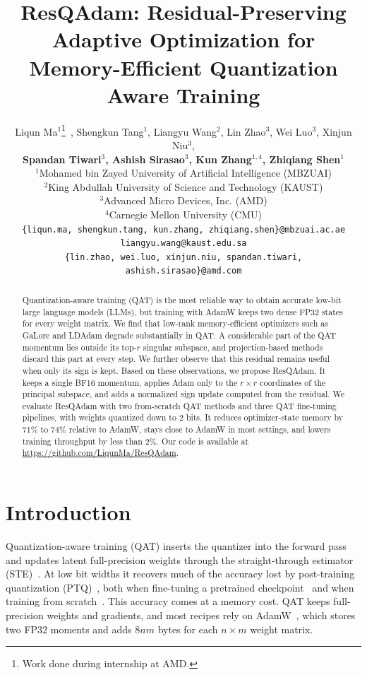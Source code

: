\documentclass{article} %
\title{ResQAdam: Residual-Preserving Adaptive Optimization for Memory-Efficient Quantization Aware Training}
\author{Liqun Ma$^{1}$\thanks{Work done during internship at AMD.}\ , Shengkun Tang$^{1}$, Liangyu Wang$^{2}$, Lin Zhao$^{3}$, Wei Luo$^{3}$, Xinjun Niu$^{3}$, \\
\textbf{Spandan Tiwari$^{3}$, Ashish Sirasao$^{3}$, Kun Zhang$^{1,4}$, Zhiqiang Shen$^{1}$} \\
$^{1}$Mohamed bin Zayed University of Artificial Intelligence (MBZUAI) \\
$^{2}$King Abdullah University of Science and Technology (KAUST) \\
$^{3}$Advanced Micro Devices, Inc. (AMD) \\
$^{4}$Carnegie Mellon University (CMU) \\
\small\texttt{\{liqun.ma, shengkun.tang, kun.zhang, zhiqiang.shen\}@mbzuai.ac.ae} \\
\small\texttt{liangyu.wang@kaust.edu.sa} \\
\small\texttt{\{lin.zhao, wei.luo, xinjun.niu, spandan.tiwari, ashish.sirasao\}@amd.com}
}
\begin{document}
\maketitle
\fancyhead{}
\renewcommand{\headrulewidth}{0pt}

\begin{abstract}


Quantization-aware training (QAT) is the most reliable way to obtain accurate low-bit large language models (LLMs), but training with AdamW keeps two dense FP32 states for every weight matrix. We find that low-rank memory-efficient optimizers such as GaLore and LDAdam degrade substantially in QAT. A considerable part of the QAT momentum lies outside its top-$r$ singular subspace, and projection-based methods discard this part at every step. We further observe that this residual remains useful when only its sign is kept. Based on these observations, we propose ResQAdam. It keeps a single BF16 momentum, applies Adam only to the $r\times r$ coordinates of the principal subspace, and adds a normalized sign update computed from the residual. We evaluate ResQAdam with two from-scratch QAT methods and three QAT fine-tuning pipelines, with weights quantized down to 2 bits. It reduces optimizer-state memory by 71\% to 74\% relative to AdamW, stays close to AdamW in most settings, and lowers training throughput by less than 2\%. Our code is available at \url{https://github.com/LiqunMa/ResQAdam}.

\end{abstract}


\section{Introduction}

Quantization-aware training (QAT) inserts the quantizer into the forward pass and updates latent full-precision weights through the straight-through estimator (STE)~\citep{bengio2013estimating}. 
At low bit widths it recovers much of the accuracy lost by post-training quantization (PTQ)~\citep{frantar2022gptq,xiao2023smoothquant}, both when fine-tuning a pretrained checkpoint~\citep{liu2024llmqat,chen2025efficientqat,liu2026paretoq} and when training from scratch~\citep{panferov2025quest,tabesh2025cage}.  
This accuracy comes at a memory cost. 
QAT keeps full-precision weights and gradients, and most recipes rely on AdamW~\citep{loshchilov2017decoupled}, which stores two FP32 moments and adds $8nm$ bytes for each $n\times m$ weight matrix. 
\end{document}
